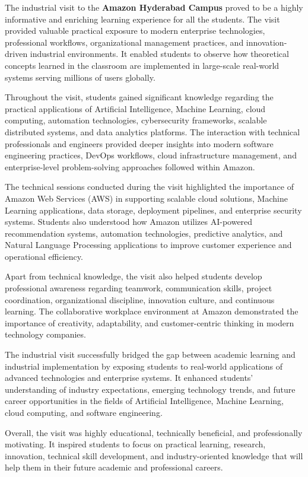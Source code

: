 The industrial visit to the \textbf{Amazon Hyderabad Campus} proved to
be a highly informative and enriching learning experience for all the
students. The visit provided valuable practical exposure to modern
enterprise technologies, professional workflows, organizational
management practices, and innovation-driven industrial environments.
It enabled students to observe how theoretical concepts learned in the
classroom are implemented in large-scale real-world systems serving
millions of users globally.

Throughout the visit, students gained significant knowledge regarding
the practical applications of Artificial Intelligence, Machine
Learning, cloud computing, automation technologies, cybersecurity
frameworks, scalable distributed systems, and data analytics platforms.
The interaction with technical professionals and engineers provided
deeper insights into modern software engineering practices, DevOps
workflows, cloud infrastructure management, and enterprise-level
problem-solving approaches followed within Amazon.

The technical sessions conducted during the visit highlighted the
importance of Amazon Web Services (AWS) in supporting scalable cloud
solutions, Machine Learning applications, data storage, deployment
pipelines, and enterprise security systems. Students also understood
how Amazon utilizes AI-powered recommendation systems, automation
technologies, predictive analytics, and Natural Language Processing
applications to improve customer experience and operational efficiency.

Apart from technical knowledge, the visit also helped students develop
professional awareness regarding teamwork, communication skills,
project coordination, organizational discipline, innovation culture,
and continuous learning. The collaborative workplace environment at
Amazon demonstrated the importance of creativity, adaptability, and
customer-centric thinking in modern technology companies.

The industrial visit successfully bridged the gap between academic
learning and industrial implementation by exposing students to
real-world applications of advanced technologies and enterprise
systems. It enhanced students’ understanding of industry expectations,
emerging technology trends, and future career opportunities in the
fields of Artificial Intelligence, Machine Learning, cloud computing,
and software engineering.

Overall, the visit was highly educational, technically beneficial, and
professionally motivating. It inspired students to focus on practical
learning, research, innovation, technical skill development, and
industry-oriented knowledge that will help them in their future
academic and professional careers.